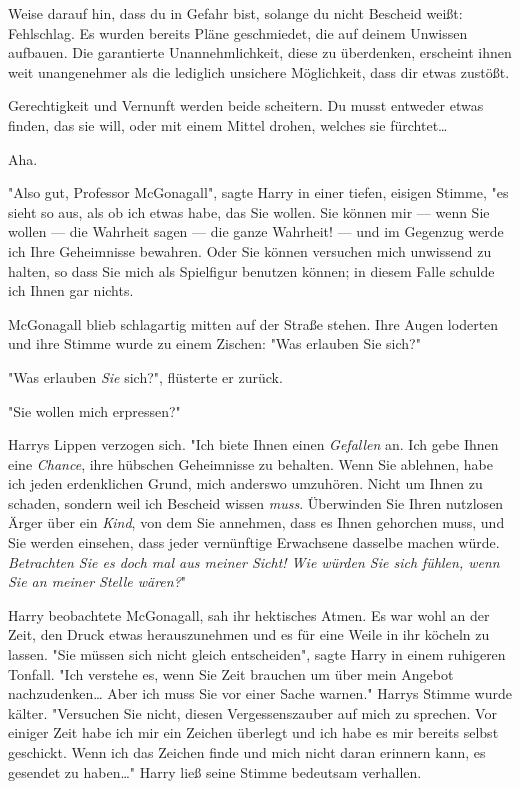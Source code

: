 {{Weise darauf hin, dass du in Gefahr bist, solange du nicht Bescheid weißt: Fehlschlag. Es wurden bereits Pläne geschmiedet, die auf deinem Unwissen aufbauen. Die garantierte Unannehmlichkeit, diese zu überdenken, erscheint ihnen weit unangenehmer als die lediglich unsichere Möglichkeit, dass dir etwas zustößt.

Gerechtigkeit und Vernunft werden beide scheitern. Du musst entweder etwas finden, das sie will, oder mit einem Mittel drohen, welches sie fürchtet…}

Aha.

"Also gut, Professor McGonagall", sagte Harry in einer tiefen, eisigen Stimme, "es sieht so aus, als ob ich etwas habe, das Sie wollen. Sie können mir --- wenn Sie wollen --- die Wahrheit sagen --- die ganze Wahrheit! --- und im Gegenzug werde ich Ihre Geheimnisse bewahren. Oder Sie können versuchen mich unwissend zu halten, so dass Sie mich als Spielfigur benutzen können; in diesem Falle schulde ich Ihnen gar nichts.

McGonagall blieb schlagartig mitten auf der Straße stehen. Ihre Augen loderten und ihre Stimme wurde zu einem Zischen: "Was erlauben Sie sich?"

"Was erlauben \emph{Sie} sich?", flüsterte er zurück.

"Sie wollen mich erpressen?"

Harrys Lippen verzogen sich. "Ich biete Ihnen einen \emph{Gefallen} an. Ich gebe Ihnen eine \emph{Chance}, ihre hübschen Geheimnisse zu behalten. Wenn Sie ablehnen, habe ich jeden erdenklichen Grund, mich anderswo umzuhören. Nicht um Ihnen zu schaden, sondern weil ich Bescheid wissen \emph{muss}. Überwinden Sie Ihren nutzlosen Ärger über ein \emph{Kind}, von dem Sie annehmen, dass es Ihnen gehorchen muss, und Sie werden einsehen, dass jeder vernünftige Erwachsene dasselbe machen würde. \emph{Betrachten Sie es doch mal aus meiner Sicht! Wie würden Sie sich fühlen, wenn Sie an meiner Stelle wären?}"

Harry beobachtete McGonagall, sah ihr hektisches Atmen. Es war wohl an der Zeit, den Druck etwas herauszunehmen und es für eine Weile in ihr köcheln zu lassen. "Sie müssen sich nicht gleich entscheiden", sagte Harry in einem ruhigeren Tonfall. "Ich verstehe es, wenn Sie Zeit brauchen um über mein Angebot nachzudenken… Aber ich muss Sie vor einer Sache warnen." Harrys Stimme wurde kälter. "Versuchen Sie nicht, diesen Vergessenszauber auf mich zu sprechen. Vor einiger Zeit habe ich mir ein Zeichen überlegt und ich habe es mir bereits selbst geschickt. Wenn ich das Zeichen finde und mich nicht daran erinnern kann, es gesendet zu haben…" Harry ließ seine Stimme bedeutsam verhallen.

}
